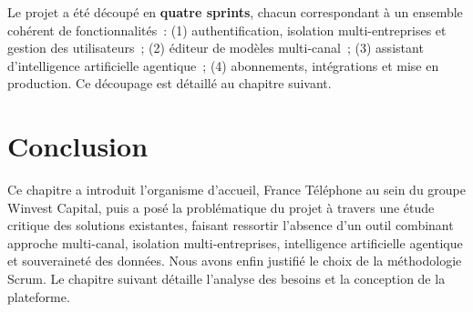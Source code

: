
Le projet a été découpé en \textbf{quatre sprints}, chacun correspondant à
un ensemble cohérent de fonctionnalités~: (1) authentification, isolation
multi-entreprises et gestion des utilisateurs~; (2) éditeur de modèles
multi-canal~; (3) assistant d'intelligence artificielle agentique~; (4)
abonnements, intégrations et mise en production. Ce découpage est détaillé
au chapitre suivant.

\section*{Conclusion}
Ce chapitre a introduit l'organisme d'accueil, France Téléphone au sein du
groupe Winvest Capital, puis a posé la problématique du projet à travers
une étude critique des solutions existantes, faisant ressortir l'absence
d'un outil combinant approche multi-canal, isolation multi-entreprises,
intelligence artificielle agentique et souveraineté des données. Nous avons
enfin justifié le choix de la méthodologie Scrum. Le chapitre suivant
détaille l'analyse des besoins et la conception de la plateforme.
